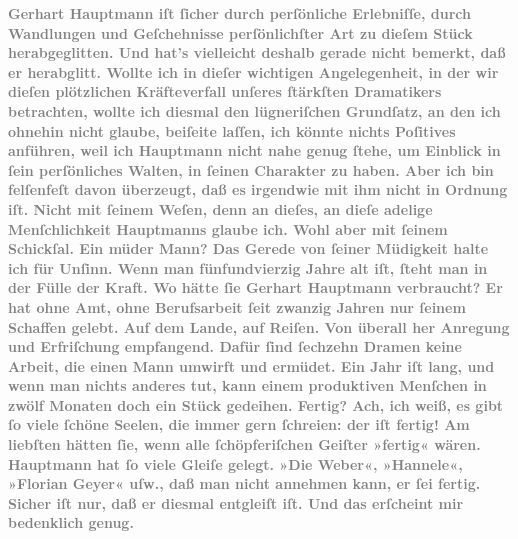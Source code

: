 \pstart
           \textcolor{gray}{\textbf{Gerhart Hauptmann iſt ſicher durch
                  perſönliche Erlebniſſe, durch Wandlungen und Geſchehnisse perſönlichſter Art zu
                  dieſem Stück
                  herabgeglitten. Und hat’s vielleicht deshalb gerade nicht bemerkt, daß er
                  herabglitt. Wollte ich in dieſer wichtigen Angelegenheit, in der wir dieſen
                  plötzlichen Kräfteverfall unſeres ſtärkſten Dramatikers betrachten, wollte ich
                  diesmal den lügneriſchen Grundſatz, an den ich ohnehin nicht glaube, beiſeite
                  laſſen, ich könnte nichts Poſitives anführen, weil ich Hauptmann nicht nahe genug ſtehe, um Einblick in ſein
                  perſönliches Walten, in ſeinen Charakter zu haben. Aber ich bin felſenfeſt davon
                  überzeugt, daß es irgendwie mit ihm nicht in Ordnung iſt. Nicht mit ſeinem Weſen,
                  denn an dieſes, an dieſe adelige Menſchlichkeit Hauptmanns glaube ich. Wohl aber mit ſeinem Schickſal. Ein müder Mann?
                  Das Gerede von ſeiner Müdigkeit halte ich für Unſinn. Wenn man fünfundvierzig
                  Jahre alt iſt, ſteht man in der Fülle der Kraft. Wo hätte ſie Gerhart Hauptmann verbraucht? Er hat ohne Amt, ohne
                  Berufsarbeit ſeit zwanzig Jahren nur ſeinem Schaffen gelebt. Auf dem Lande, auf
                  Reiſen. Von überall her Anregung und Erfriſchung empfangend. Dafür ſind ſechzehn
                  Dramen keine Arbeit, die einen Mann umwirft und ermüdet. Ein Jahr iſt lang, und
                  wenn man nichts anderes tut, kann einem produktiven Menſchen in zwölf Monaten doch
                  ein Stück gedeihen. Fertig? Ach, ich weiß, es gibt ſo viele ſchöne Seelen, die
                  immer gern ſchreien: der iſt fertig! Am liebſten hätten ſie, wenn alle
                  ſchöpferiſchen Geiſter »fertig« wären. Hauptmann hat ſo viele Gleiſe gelegt. »Die Weber«, »Hannele«, »Florian Geyer« uſw., daß man nicht annehmen
                  kann, er ſei fertig. Sicher iſt nur, daß er diesmal entgleiſt iſt. Und das
                  erſcheint mir bedenklich genug.}}\pend
